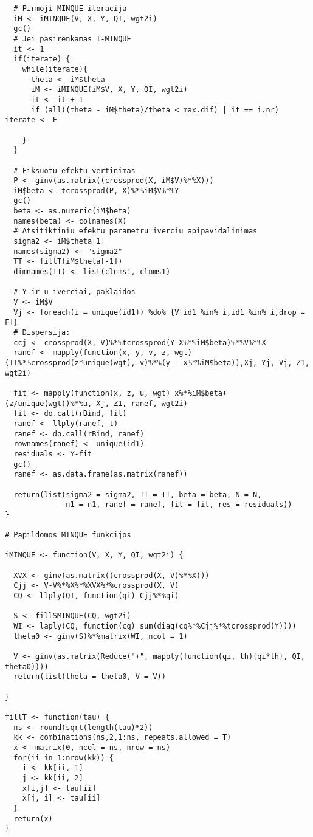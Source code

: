 \documentclass[11pt,a4paper]{article}
\begin{document}
\begin{appendix}
\begin{footnotesize}
\begin{verbatim}
  # Pirmoji MINQUE iteracija
  iM <- iMINQUE(V, X, Y, QI, wgt2i)
  gc()
  # Jei pasirenkamas I-MINQUE
  it <- 1
  if(iterate) {
    while(iterate){
      theta <- iM$theta
      iM <- iMINQUE(iM$V, X, Y, QI, wgt2i)
      it <- it + 1
      if (all((theta - iM$theta)/theta < max.dif) | it == i.nr) iterate <- F

    }
  }
  
  # Fiksuotu efektu vertinimas
  P <- ginv(as.matrix((crossprod(X, iM$V)%*%X)))
  iM$beta <- tcrossprod(P, X)%*%iM$V%*%Y
  gc()
  beta <- as.numeric(iM$beta)
  names(beta) <- colnames(X)
  # Atsitiktiniu efektu parametru iverciu apipavidalinimas
  sigma2 <- iM$theta[1]
  names(sigma2) <- "sigma2"
  TT <- fillT(iM$theta[-1])
  dimnames(TT) <- list(clnms1, clnms1)
  
  # Y ir u iverciai, paklaidos
  V <- iM$V
  Vj <- foreach(i = unique(id1)) %do% {V[id1 %in% i,id1 %in% i,drop = F]}
  # Dispersija:
  ccj <- crossprod(X, V)%*%tcrossprod(Y-X%*%iM$beta)%*%V%*%X
  ranef <- mapply(function(x, y, v, z, wgt) (TT%*%crossprod(z*unique(wgt), v)%*%(y - x%*%iM$beta)),Xj, Yj, Vj, Z1, wgt2i)
  
  fit <- mapply(function(x, z, u, wgt) x%*%iM$beta+(z/unique(wgt))%*%u, Xj, Z1, ranef, wgt2i)
  fit <- do.call(rBind, fit)
  ranef <- llply(ranef, t)
  ranef <- do.call(rBind, ranef)
  rownames(ranef) <- unique(id1)
  residuals <- Y-fit
  gc()
  ranef <- as.data.frame(as.matrix(ranef))

  return(list(sigma2 = sigma2, TT = TT, beta = beta, N = N, 
              n1 = n1, ranef = ranef, fit = fit, res = residuals))
}

# Papildomos MINQUE funkcijos

iMINQUE <- function(V, X, Y, QI, wgt2i) {
  
  XVX <- ginv(as.matrix((crossprod(X, V)%*%X)))
  Cjj <- V-V%*%X%*%XVX%*%crossprod(X, V)
  CQ <- llply(QI, function(qi) Cjj%*%qi)
  
  S <- fillSMINQUE(CQ, wgt2i)
  WI <- laply(CQ, function(cq) sum(diag(cq%*%Cjj%*%tcrossprod(Y))))
  theta0 <- ginv(S)%*%matrix(WI, ncol = 1)
  
  V <- ginv(as.matrix(Reduce("+", mapply(function(qi, th){qi*th}, QI, theta0))))
  return(list(theta = theta0, V = V))
  
}

fillT <- function(tau) {
  ns <- round(sqrt(length(tau)*2))
  kk <- combinations(ns,2,1:ns, repeats.allowed = T)
  x <- matrix(0, ncol = ns, nrow = ns)
  for(ii in 1:nrow(kk)) {
    i <- kk[ii, 1]
    j <- kk[ii, 2]
    x[i,j] <- tau[ii]
    x[j, i] <- tau[ii]
  }
  return(x)
}


\end{verbatim}
\end{footnotesize}
\end{appendix}
\end{document}
